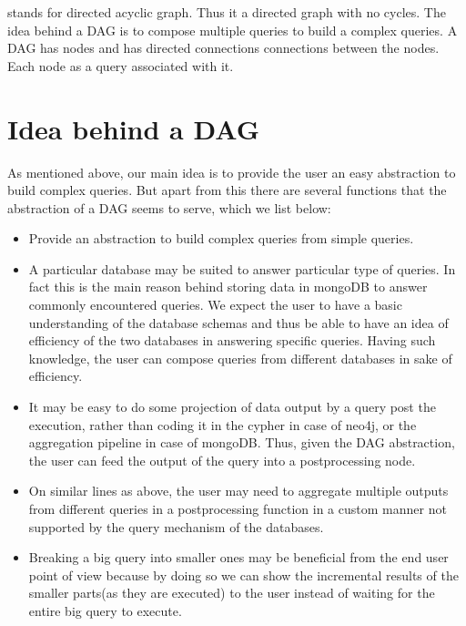 \documentclass[letterpaper,10pt,english]{sphinxmanual}
\begin{document}
 stands for directed acyclic graph. Thus it a directed graph with no cycles. The idea behind a DAG is to compose multiple queries to build a complex queries. A DAG has nodes and has directed connections connections between the nodes. Each node as a query associated with it.


\section{Idea behind a DAG}
\label{\detokenize{dag:idea-behind-a-dag}}
As mentioned above, our main idea is to provide the user an easy abstraction to build complex queries. But apart from this there are several functions that the abstraction of a DAG seems to serve, which we list below:
\begin{itemize}
\item {} 
Provide an abstraction to build complex queries from simple queries.

\item {} 
A particular database may be suited to answer particular type of queries. In fact this is the main reason behind storing data in mongoDB to answer commonly encountered queries. We expect the user to have a basic understanding of the database schemas and thus be able to have an idea of efficiency of the two databases in answering specific queries. Having such knowledge, the user can compose queries from different databases in sake of efficiency.

\item {} 
It may be easy to do some projection of data output by a query post the execution, rather than coding it in the cypher in case of neo4j, or the aggregation pipeline in case of mongoDB. Thus, given the DAG abstraction, the user can feed the output of the query into a postprocessing node.

\item {} 
On similar lines as above, the user may need to aggregate multiple outputs from different queries in a postprocessing function in a custom manner not supported by the query mechanism of the databases.

\item {} 
Breaking a big query into smaller ones may be beneficial from the end user point of view because by doing so we can show the incremental results of the smaller parts(as they are executed) to the user instead of waiting for the entire big query to execute.

\end{itemize}
\end{document}
